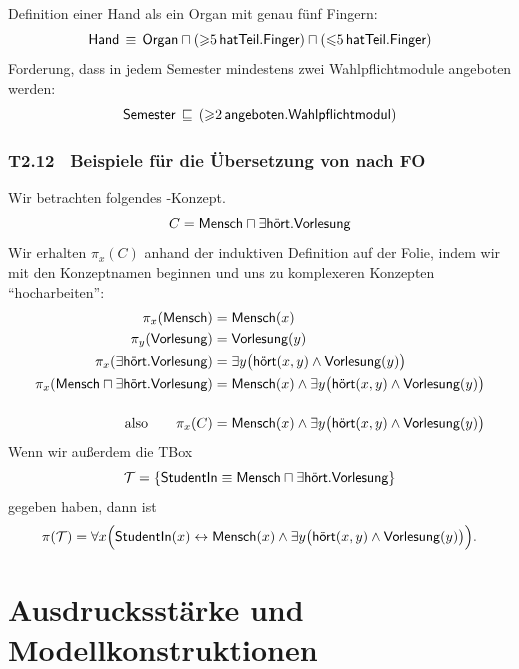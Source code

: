 \documentclass[fontsize=11pt, twoside=false, numbers=autoenddot]{scrbook}
\begin{document}
Definition einer Hand als ein Organ mit genau fünf Fingern:
\[
  \textsf{Hand} \,\equiv\, \textsf{Organ} \sqcap (\mathord{\geqslant}5\,\textsf{hatTeil}.\textsf{Finger})
                                      \sqcap (\mathord{\leqslant}5\,\textsf{hatTeil}.\textsf{Finger})
\]
%
\parI
Forderung, dass in jedem Semester mindestens zwei Wahlpflichtmodule angeboten werden:
\[
  \textsf{Semester} \,\sqsubseteq\, (\mathord{\geqslant}2\,\textsf{angeboten}.\textsf{Wahlpflichtmodul})
\]

\section*{T2.12~ Beispiele für die Übersetzung von {\boldmath \ALC} nach FO}

Wir betrachten folgendes \ALC-Konzept.
\[
  C = \textsf{Mensch} \sqcap \exists \textsf{hört}.\textsf{Vorlesung}
\]
Wir erhalten $\pi_x(C)$ anhand der induktiven Definition auf der Folie,
indem wir mit den Konzeptnamen beginnen und uns zu komplexeren Konzepten
"`hocharbeiten"':
%
\begin{align*}
  \pi_x(\textsf{Mensch}) & = \textsf{Mensch}(x)    \\
  \pi_y(\textsf{Vorlesung}) & = \textsf{Vorlesung}(y) \\
  \pi_x(\exists \textsf{hört}.\textsf{Vorlesung}) & = \exists y\big(\textsf{hört}(x,y) \land \textsf{Vorlesung}(y)\big) \\
  \pi_x(\textsf{Mensch} \sqcap \exists \textsf{hört}.\textsf{Vorlesung}) & = \textsf{Mensch}(x) \land \exists y\big(\textsf{hört}(x,y) \land \textsf{Vorlesung}(y)\big) \\[12pt]
  \text{also}\qquad
  \pi_x(C) & = \textsf{Mensch}(x) \land \exists y\big(\textsf{hört}(x,y) \land \textsf{Vorlesung}(y)\big)
\end{align*}
%
Wenn wir außerdem die TBox
\[
  \mathcal{T} = \{\textsf{StudentIn} \equiv \textsf{Mensch} \sqcap \exists \textsf{hört}.\textsf{Vorlesung}\}
\]
gegeben haben, dann ist
\[
  \pi(\mathcal{T}) = \forall x\Big(
    \textsf{StudentIn}(x) \leftrightarrow 
    \textsf{Mensch}(x) \land \exists y\big(\textsf{hört}(x,y) \land \textsf{Vorlesung}(y)\big)
  \Big).
\]

\part{Ausdrucksstärke und Modellkonstruktionen}
\end{document}
